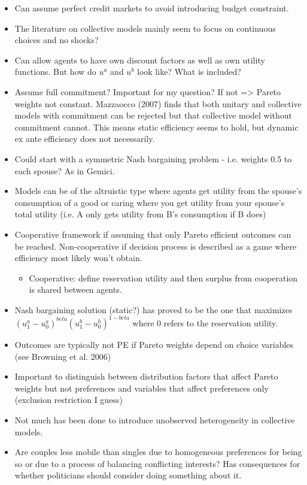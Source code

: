 \begin{itemize}
\item Can assume perfect credit markets to avoid introducing budget constraint.
\item The literature on collective models mainly seem to focus on continuous choices and no shocks?
\item Can allow agents to have own discount factors as well as own utility functions. But how do $u^a$ and $u^b$ look like? What is included?
\item Assume full commitment? Important for my question? If not => Pareto weights not constant. Mazzaocco (2007) finds that both unitary and collective models with commitment can be rejected but that collective model without commitment cannot. This means static efficiency seems to hold, but dynamic ex ante efficiency does not necessarily.
\item Could start with a symmetric Nash bargaining problem - i.e. weights 0.5 to each spouse? As in Gemici.
\item Models can be of the altruistic type where agents get utility from the spouse's consumption of a good or caring where you get utility from your spouse's total utility (i.e. A only gets utility from B's consumption if B does)
\item Cooperative framework if assuming that only Pareto efficient outcomes can be reached. Non-cooperative if decision process is described as a game where efficiency most likely won't obtain.
\begin{itemize}
\item Cooperative: define reservation utility and then surplus from cooperation is shared between agents.
\end{itemize}
\item Nash bargaining solution (static?) has proved to be the one that maximizes $(u^a_1-u^a_0)^{beta}(u^b_1-u^b_0)^{1-beta}$ where 0 refers to the reservation utility.
\item Outcomes are typically not PE if Pareto weights depend on choice variables (see Browning et al. 2006)
\item Important to distinguish between distribution factors that affect Pareto weights but not preferences and variables that affect preferences only (exclusion restriction I guess)
\item Not much has been done to introduce unobserved heterogeneity in collective models.
\item Are couples less mobile than singles due to homogeneous preferences for being so or due to a process of balancing conflicting interests? Has consequences for whether politicians should consider doing something about it.

\end{itemize}
